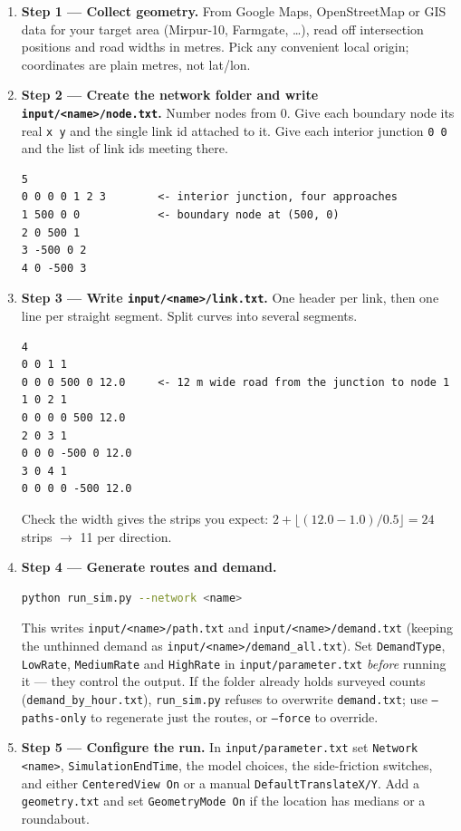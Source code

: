 \documentclass[11pt, a4paper]{article}
\newcommand{\code}[1]{\texttt{#1}}
\begin{document}
\begin{enumerate}
    \item \textbf{Step 1 --- Collect geometry.} From Google Maps, OpenStreetMap
    or GIS data for your target area (Mirpur-10, Farmgate, \dots), read off
    intersection positions and road widths in metres. Pick any convenient local
    origin; coordinates are plain metres, not lat/lon.

    \item \textbf{Step 2 --- Create the network folder and write
    \code{input/<name>/node.txt}.} Number nodes from 0. Give each boundary node
    its real \code{x y} and the single link id attached to it. Give each interior
    junction \code{0 0} and the list of link ids meeting there.
\begin{lstlisting}
5
0 0 0 0 1 2 3        <- interior junction, four approaches
1 500 0 0            <- boundary node at (500, 0)
2 0 500 1
3 -500 0 2
4 0 -500 3
\end{lstlisting}

    \item \textbf{Step 3 --- Write \code{input/<name>/link.txt}.} One header per
    link, then one line per straight segment. Split curves into several
    segments.
\begin{lstlisting}
4
0 0 1 1
0 0 0 500 0 12.0     <- 12 m wide road from the junction to node 1
1 0 2 1
0 0 0 0 500 12.0
2 0 3 1
0 0 0 -500 0 12.0
3 0 4 1
0 0 0 0 -500 12.0
\end{lstlisting}
    Check the width gives the strips you expect:
    $2 + \lfloor (12.0 - 1.0)/0.5 \rfloor = 24$ strips $\rightarrow$ 11 per
    direction.

    \item \textbf{Step 4 --- Generate routes and demand.}
\begin{lstlisting}[language=bash]
python run_sim.py --network <name>
\end{lstlisting}
    This writes \code{input/<name>/path.txt} and \code{input/<name>/demand.txt}
    (keeping the unthinned demand as \code{input/<name>/demand\_all.txt}). Set
    \code{DemandType}, \code{LowRate}, \code{MediumRate} and \code{HighRate} in
    \code{input/parameter.txt} \emph{before} running it --- they control the
    output. If the folder already holds surveyed counts
    (\code{demand\_by\_hour.txt}), \code{run\_sim.py} refuses to overwrite
    \code{demand.txt}; use \code{--paths-only} to regenerate just the routes, or
    \code{--force} to override.

    \item \textbf{Step 5 --- Configure the run.} In \code{input/parameter.txt}
    set \code{Network <name>}, \code{SimulationEndTime}, the model choices, the
    side-friction switches, and either \code{CenteredView On} or a manual
    \code{DefaultTranslateX/Y}. Add a \code{geometry.txt} and set
    \code{GeometryMode On} if the location has medians or a roundabout.


\end{enumerate}
\end{document}
